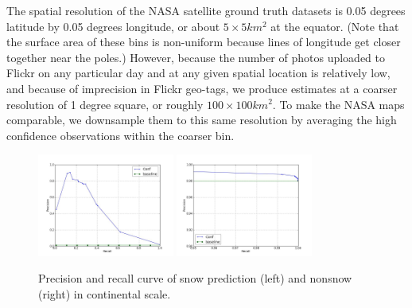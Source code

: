 The spatial resolution of the NASA satellite ground truth datasets is 0.05 degrees
latitude by 0.05 degrees longitude, or about $5 \times 5 km^2$ at the
equator.  (Note that the surface area of these bins is
non-uniform because lines of longitude get closer together near the
poles.)  However, because the number of photos uploaded to Flickr on
any particular day and at any given spatial location is relatively
low, and because of imprecision in Flickr geo-tags, we produce
estimates at a coarser resolution of 1 degree square, or roughly $100
\times 100 km^2$. To make the NASA maps comparable, we downsample them
to this same resolution by averaging the high confidence observations within the coarser bin.

\begin{figure}
\begin{center}

\includegraphics[width=0.40\textwidth]{figs/PR-snow.jpg}
\includegraphics[width=0.40\textwidth]{figs/PR-nonsnow.jpg}

\end{center}
\vspace{-24pt}
\caption{Precision and recall curve of snow prediction (left) and nonsnow (right) in continental scale.}
\label{fig:snowcurve}
\vspace{-12pt}
\end{figure}

